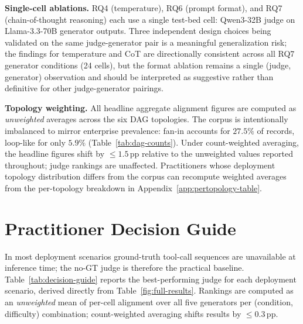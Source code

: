 \textbf{Single-cell ablations.} RQ4 (temperature), RQ6 (prompt format), and RQ7 (chain-of-thought reasoning) each use a single test-bed cell: Qwen3-32B judge on Llama-3.3-70B generator outputs. Three independent design choices being validated on the same judge-generator pair is a meaningful generalization risk; the findings for temperature and CoT are directionally consistent across all RQ7 generator conditions (24 cells), but the format ablation remains a single (judge, generator) observation and should be interpreted as suggestive rather than definitive for other judge-generator pairings.

\textbf{Topology weighting.} All headline aggregate alignment figures are computed as \emph{unweighted} averages across the six DAG topologies. The corpus is intentionally imbalanced to mirror enterprise prevalence: fan-in accounts for $27.5\%$ of records, loop-like for only $5.9\%$ (Table~\ref{tab:dag-counts}). Under count-weighted averaging, the headline figures shift by $\leq 1.5$\,pp relative to the unweighted values reported throughout; judge rankings are unaffected. Practitioners whose deployment topology distribution differs from the corpus can recompute weighted averages from the per-topology breakdown in Appendix~\ref{app:pertopology-table}.

\section{Practitioner Decision Guide}
\label{app:decision-guide}

In most deployment scenarios ground-truth tool-call sequences are unavailable at inference time; the no-GT judge is therefore the practical baseline. Table~\ref{tab:decision-guide} reports the best-performing judge for each deployment scenario, derived directly from Table~\ref{fig:full-results}. Rankings are computed as an \emph{unweighted} mean of per-cell alignment over all five generators per (condition, difficulty) combination; count-weighted averaging shifts results by $\leq 0.3$\,pp.

